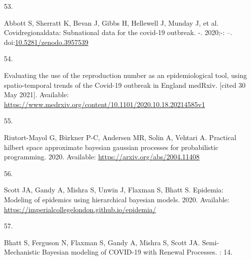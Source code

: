 \documentclass[10pt,letterpaper]{article} %
\newlength{\cslhangindent}
\newlength{\csllabelwidth}
\newlength{\cslentryspacingunit} %
\newenvironment{CSLReferences}[2] %
 {%
  \setlength{\parindent}{0pt}
  \ifodd #1
  \let\oldpar\par
  \def\par{\hangindent=\cslhangindent\oldpar}
  \fi
  \setlength{\parskip}{#2\cslentryspacingunit}
 }%
 {}
\newcommand{\CSLLeftMargin}[1]{\parbox[t]{\csllabelwidth}{#1}}
\newcommand{\CSLRightInline}[1]{\parbox[t]{\linewidth - \csllabelwidth}{#1}\break}
\providecommand{\DIFaddbegin}{} %
\providecommand{\DIFaddend}{} %
\providecommand{\DIFdelbegin}{} %
\providecommand{\DIFdelend}{} %
\newcommand{\DIFscaledelfig}{0.5}
\newlength{\DIFdelgraphicswidth} %
\newlength{\DIFdelgraphicsheight} %
\newcommand{\DIFaddincludegraphics}[2][]{{\color{blue}\fbox{\DIFOincludegraphics[#1]{#2}}}} %
\newcommand{\DIFdelincludegraphics}[2][]{%
\sbox{\DIFdelgraphicsbox}{\DIFOincludegraphics[#1]{#2}}%
\settoboxwidth{\DIFdelgraphicswidth}{\DIFdelgraphicsbox} %
\settoboxtotalheight{\DIFdelgraphicsheight}{\DIFdelgraphicsbox} %
\scalebox{\DIFscaledelfig}{%
\parbox[b]{\DIFdelgraphicswidth}{\usebox{\DIFdelgraphicsbox}\\[-\baselineskip] \rule{\DIFdelgraphicswidth}{0em}}\llap{\resizebox{\DIFdelgraphicswidth}{\DIFdelgraphicsheight}{%
\setlength{\unitlength}{\DIFdelgraphicswidth}%
\begin{picture}(1,1)%
\thicklines\linethickness{2pt} %
{\color[rgb]{1,0,0}\put(0,0){\framebox(1,1){}}}%
{\color[rgb]{1,0,0}\put(0,0){\line( 1,1){1}}}%
{\color[rgb]{1,0,0}\put(0,1){\line(1,-1){1}}}%
\end{picture}%
}\hspace*{3pt}}} %
} %
\DeclareRobustCommand{\DIFaddbegin}{\DIFOaddbegin \let\includegraphics\DIFaddincludegraphics} %
\DeclareRobustCommand{\DIFaddend}{\DIFOaddend \let\includegraphics\DIFOincludegraphics} %
\DeclareRobustCommand{\DIFdelbegin}{\DIFOdelbegin \let\includegraphics\DIFdelincludegraphics} %
\DeclareRobustCommand{\DIFdelend}{\DIFOaddend \let\includegraphics\DIFOincludegraphics} %
\begin{document}
\begin{CSLReferences}{0}{0}
\leavevmode{}%
\CSLLeftMargin{53. }
\DIFdelbegin %
\DIFdelend \DIFaddbegin \CSLRightInline{Abbott S, Sherratt K, Bevan J, Gibbs H, Hellewell J,
Munday J, et al. Covidregionaldata: Subnational data for the covid-19
outbreak. -. 2020;-: --.
doi:\href{https://doi.org/10.5281/zenodo.3957539}{10.5281/zenodo.3957539}}
\DIFaddend 

\leavevmode{}%
\CSLLeftMargin{54. }
\DIFdelbegin %
\DIFdelend \DIFaddbegin \CSLRightInline{Evaluating the use of the reproduction number as an
epidemiological tool, using spatio-temporal trends of the {Covid-19}
outbreak in {England} \textbar{} {medRxiv}. {[}cited 30 May 2021{]}.
Available:
\url{https://www.medrxiv.org/content/10.1101/2020.10.18.20214585v1}}
\DIFaddend 

\leavevmode{}%
\CSLLeftMargin{55. }
\DIFdelbegin %
\DIFdelend \DIFaddbegin \CSLRightInline{Riutort-Mayol G, Bürkner P-C, Andersen MR, Solin A,
Vehtari A. Practical hilbert space approximate bayesian gaussian
processes for probabilistic programming. 2020. Available:
\url{https://arxiv.org/abs/2004.11408}}
\DIFaddend 

\leavevmode{}%
\CSLLeftMargin{56. }
\DIFdelbegin %
\DIFdelend \DIFaddbegin \CSLRightInline{Scott JA, Gandy A, Mishra S, Unwin J, Flaxman S, Bhatt
S. Epidemia: Modeling of epidemics using hierarchical bayesian models.
2020. Available:
\url{https://imperialcollegelondon.github.io/epidemia/}}
\DIFaddend 

\leavevmode{}%
\CSLLeftMargin{57. }
\DIFdelbegin %
\DIFdelend \DIFaddbegin \CSLRightInline{Bhatt S, Ferguson N, Flaxman S, Gandy A, Mishra S, Scott
JA. Semi-{Mechanistic Bayesian} modeling of {COVID-19} with {Renewal
Processes}. : 14. }
\DIFaddend 

\end{CSLReferences}
\DIFaddbegin 

\nolinenumbers
\DIFaddend 
\end{document}
